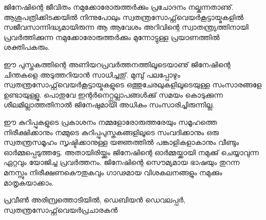 
ജിനേഷിന്റെ ജീവിതം നമുക്കോരോരുത്തര്‍ക്കും പ്രചോദനം നല്കുന്നതാണു്. ആശുപത്രിക്കിടക്കയില്‍ നിന്നുപോലും സ്വതന്ത്രസോഫ്റ്റ്‌വെയര്‍കൂട്ടായ്മകളില്‍ സജീവസാന്നിദ്ധ്യമായിരുന്ന ആ ആവേശം അറിവിന്റെ സ്വാതന്ത്ര്യത്തിനായി പ്രവര്‍ത്തിക്കുന്ന നമുക്കോരോരുത്തര്‍ക്കും മുന്നോട്ടുള്ള പ്രയാണത്തില്‍ ശക്തിപകരും. 

ഈ പുസ്തകത്തിന്റെ അണിയറപ്രവര്‍ത്തനത്തിലൂടെയാണു് ജിനേഷിന്റെ ചിന്തകളെ അടുത്തറിയാന്‍ സാധിച്ചതു്. മുമ്പു് പലപ്പോഴും സ്വതന്ത്രസോഫ്റ്റ്‌വെയര്‍കൂട്ടായ്മകളുടെ ഒത്തുചേരലുകളിലൂടെയുള്ള സംസാരങ്ങളേ ഉണ്ടായുള്ളൂ. പൊതുവേ ഇന്റര്‍നെറ്റ്സല്ലാപങ്ങള്‍ക്കു് സമയം കൊടുക്കുന്ന ശീലമില്ലാത്തതിനാല്‍ ജിനേഷുമായി അധികം സംസാരിച്ചിരുന്നില്ല.

ഈ കുറിപ്പുകളുടെ പ്രകാശനം നമ്മളോരോരുത്തരേയും സമൂഹത്തെ നിരീക്ഷിക്കാനും നമ്മുടെ കുറിപ്പുപുസ്തകങ്ങളിലൂടെ സംവദിക്കാനും ഒരു സ്വതന്ത്രസമൂഹം സൃഷ്ടിക്കാനുള്ള യജ്ഞത്തില്‍ പങ്കാളികളാകാനും വീണ്ടും ഓര്‍മ്മപ്പെടുത്തട്ടേ. അതായിരിയ്ക്കും ജിനേഷിന്റെ ഓര്‍മ്മയ്ക്കായി നമുക്കു് ചെയ്യാവുന്ന ഏറ്റവും യോജിച്ച പ്രവര്‍ത്തനം. ജിനേഷിന്റെ സൌമ്യമായ ഭാഷയും തുറന്ന മനസ്സും നിരീക്ഷണകൌതുകവും ഗാഢമായ വിശകലനങ്ങളും നമുക്കും മാതൃകയാക്കാം.

\hspace*{2em}പ്രവീണ്‍ അരിമ്പ്രത്തൊടിയില്‍, ഡെബിയന്‍ ഡെവലപ്പര്‍, സ്വതന്ത്രസോഫ്റ്റ്‌വെയര്‍പ്രചാരകന്‍
\newpage
